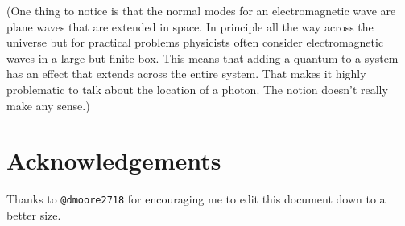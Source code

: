\documentclass[a4paper]{article}
\begin{document}
(One thing to notice is that the normal modes for an electromagnetic wave are plane waves that are extended in space.
In principle all the way across the universe but for practical problems physicists often consider electromagnetic waves in a large but finite box.
This means that adding a quantum to a system has an effect that extends across the entire system.
That makes it highly problematic to talk about the location of a photon.
The notion doesn't really make any sense.)

\section{Acknowledgements}
Thanks to \texttt{@dmoore2718} for encouraging me to edit this document down to a better size.
\end{document}
